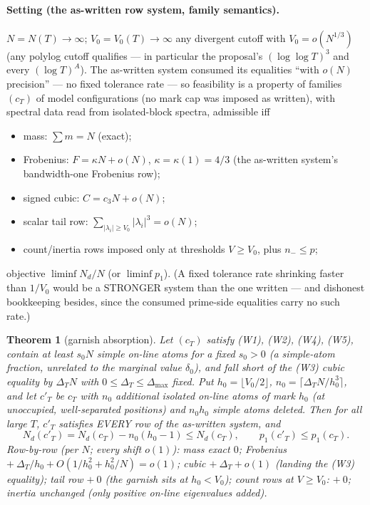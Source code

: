 \documentclass[11pt]{article}
\theoremstyle{plain}
\newtheorem{theorem}{Theorem}[section]
\theoremstyle{definition}
\theoremstyle{remark}
\newcommand{\Nd}{N_{d}}
\begin{document}
\paragraph{Setting (the as-written row system, family semantics).}
$N = N(T) \to \infty$; $V_0 = V_0(T) \to \infty$ any divergent cutoff with
$V_0 = o(N^{1/3})$ (any polylog cutoff qualifies --- in particular the proposal's
$(\log\log T)^3$ and every $(\log T)^A$). The as-written system consumed its
equalities ``with $o(N)$ precision'' --- no fixed tolerance rate --- so
feasibility is a property of families $(c_T)$ of model configurations (no mark cap
was imposed as written), with spectral data read from isolated-block spectra,
admissible iff
\begin{itemize}
\item[(W1)] mass: $\sum m = N$ (exact);
\item[(W2)] Frobenius: $F = \kappa N + o(N)$, $\kappa = \kappa(1) = 4/3$ (the
  as-written system's bandwidth-one Frobenius row);
\item[(W3)] signed cubic: $C = c_3 N + o(N)$;
\item[(W4)] scalar tail row:
  $\sum_{|\lambda_i| \ge V_0} |\lambda_i|^3 = o(N)$;
\item[(W5)] count/inertia rows imposed only at thresholds $V \ge V_0$, plus
  $n_- \le p$;
\end{itemize}
objective $\liminf \Nd/N$ (or $\liminf p_1$). (A fixed tolerance rate shrinking
faster than $1/V_0$ would be a STRONGER system than the one written --- and
dishonest bookkeeping besides, since the consumed prime-side equalities carry no
such rate.)

\begin{theorem}[garnish absorption]
\label{thm:garnish}
Let $(c_T)$ satisfy (W1), (W2), (W4), (W5), contain at least $s_0 N$ simple
on-line atoms for a fixed $s_0 > 0$ (a simple-atom fraction, unrelated to the
marginal value $\delta_0$), and fall short of the (W3) cubic equality by
$\Delta_T N$ with $0 \le \Delta_T \le \Delta_{\max}$ fixed. Put
$h_0 = \lfloor V_0/2 \rfloor$, $n_0 = \lceil \Delta_T N/h_0^3 \rceil$, and let
$c'_T$ be $c_T$ with $n_0$ additional isolated on-line atoms of mark $h_0$ (at
unoccupied, well-separated positions) and $n_0 h_0$ simple atoms deleted. Then
for all large $T$, $c'_T$ satisfies EVERY row of the as-written system, and
\[
  \Nd(c'_T) = \Nd(c_T) - n_0 (h_0 - 1) \le \Nd(c_T),
  \qquad p_1(c'_T) \le p_1(c_T).
\]
Row-by-row (per $N$; every shift $o(1)$): mass exact $0$; Frobenius
$+\ \Delta_T/h_0 + O(1/h_0^2 + h_0^2/N) = o(1)$; cubic $+\ \Delta_T + o(1)$
(landing the (W3) equality); tail row $+\ 0$ (the garnish sits at $h_0 < V_0$);
count rows at $V \ge V_0$: $+\ 0$; inertia unchanged (only positive on-line
eigenvalues added).
\end{theorem}
\end{document}
